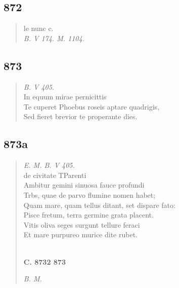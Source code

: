 \documentclass[11pt, a4paper]{report}
\begin{document}
            \subsection*{872}
      \begin{verse}
      le nunc c. \\ \textit{B. V 174. M. 1104.} \\ 
      \end{verse}
  
            \subsection*{873}
      \begin{verse}
      \textit{B. V 405.} \\ In equum mirae pernicittis \\ Te cuperet Phoebus roseis aptare quadrigis, \\ Sed fieret brevior te properante dies. \\ 
      \end{verse}
  
            \subsection*{873a}
      \begin{verse}
      \textit{E. M. B. V 405.} \\ de civitate TParenti \\ Ambitur gemini sinuosa fauce profundi \\ Trbs, quae de parvo flumine nomen habet; \\ Quam mare, quam tellus ditant, set dispare fato: \\ Pisce fretum, terra germine grata placent. \\ Vitis oliva seges surgunt tellure feraci \\ Et mare purpureo murice dite rubet. \\ 
        ﻿\pagebreak 
    \begin{center} \textbf{C. 8732 873} \end{center} \marginpar{[319]} \textit{B. M.} \\ 
      \end{verse}
  
\end{document}
